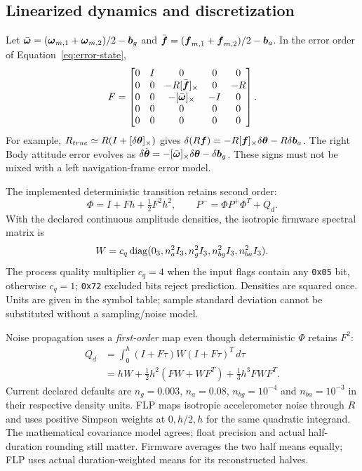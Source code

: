 \subsection{Linearized dynamics and discretization}
Let $\bar{\boldsymbol{\omega}}=(\boldsymbol{\omega}_{m,1}+\boldsymbol{\omega}_{m,2})/2-\boldsymbol{b}_g$ and
$\bar{\boldsymbol{f}}=(\boldsymbol{f}_{m,1}+\boldsymbol{f}_{m,2})/2-\boldsymbol{b}_a$. In the error order of Equation~\eqref{eq:error-state},
\begin{equation}
F=\begin{bmatrix}
0&I&0&0&0\\
0&0&-R[\bar{\boldsymbol{f}}]_{\times}&0&-R\\
0&0&-[\bar{\boldsymbol{\omega}}]_{\times}&-I&0\\
0&0&0&0&0\\
0&0&0&0&0
\end{bmatrix}.
\label{eq:eskf-f}
\end{equation}
For example, $R_{true}\simeq R(I+[\delta\boldsymbol{\theta}]_{\times})$ gives
$\delta(R\boldsymbol{f})=-R[\boldsymbol{f}]_{\times}\delta\boldsymbol{\theta}-R\delta\boldsymbol{b}_a$.
The right Body attitude error evolves as
$\delta\dot{\boldsymbol{\theta}}=-[\bar{\boldsymbol{\omega}}]_{\times}\delta\boldsymbol{\theta}-\delta\boldsymbol{b}_g$.
These signs must not be mixed with a left navigation-frame error model.

The implemented deterministic transition retains second order:
\begin{equation}
\Phi=I+Fh+\tfrac12F^2h^2,\qquad P^- = \Phi P^+\Phi^T+Q_d.
\end{equation}
With the declared continuous amplitude densities, the isotropic firmware spectral matrix is
\begin{equation}
W=c_q\operatorname{diag}(0_3,n_a^2I_3,n_g^2I_3,n_{bg}^2I_3,n_{ba}^2I_3).
\end{equation}
The process quality multiplier $c_q=4$ when the input flags contain any \texttt{0x05} bit, otherwise $c_q=1$; \texttt{0x72} excluded bits reject prediction. Densities are squared once. Units are given in the symbol table; sample standard deviation cannot be substituted without a sampling/noise model.

Noise propagation uses a \emph{first-order} map even though deterministic $\Phi$ retains $F^2$:
\begin{align}
Q_d&=\int_0^h(I+F\tau)W(I+F\tau)^T\,d\tau\nonumber\\
&=hW+\tfrac12h^2(FW+WF^T)+\tfrac13h^3FWF^T.
\label{eq:eskf-q}
\end{align}
Current declared defaults are $n_g=0.003$, $n_a=0.08$, $n_{bg}=10^{-4}$ and $n_{ba}=10^{-3}$ in their respective density units. FLP maps isotropic accelerometer noise through $R$ and uses positive Simpson weights at $0,h/2,h$ for the same quadratic integrand. The mathematical covariance model agrees; float precision and actual half-duration rounding still matter. Firmware averages the two half means equally; FLP uses actual duration-weighted means for its reconstructed halves.

